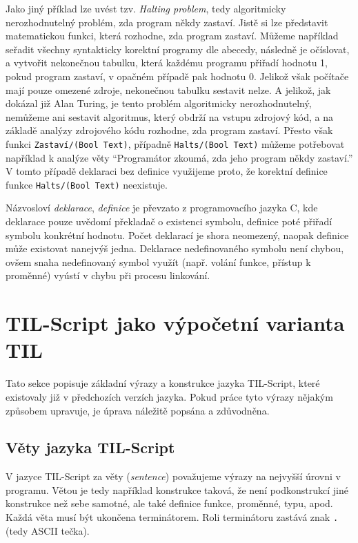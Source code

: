 Jako jiný příklad lze uvést tzv. \textit{Halting problem}, tedy algoritmicky nerozhodnutelný
problém, zda program někdy zastaví. Jistě si lze představit matematickou funkci, která rozhodne,
zda program zastaví. Můžeme například seřadit všechny syntakticky korektní programy dle abecedy,
následně je očíslovat, a vytvořit nekonečnou tabulku, která každému programu přiřadí hodnotu 1,
pokud program zastaví, v opačném případě pak hodnotu 0. Jelikož však počítače mají pouze omezené
zdroje, nekonečnou tabulku sestavit nelze. A jelikož, jak dokázal již Alan Turing, je tento problém
algoritmicky nerozhodnutelný, nemůžeme ani sestavit algoritmus, který obdrží na vstupu zdrojový kód,
a na základě analýzy zdrojového kódu rozhodne, zda program zastaví\cite{halting-problem-src}. Přesto
však funkci \lstinline{Zastaví/(Bool Text)}, případně \lstinline{Halts/(Bool Text)} můžeme
potřebovat například k analýze věty ``Programátor zkoumá, zda jeho program někdy zastaví.'' V tomto
případě deklaraci bez definice využijeme proto, že korektní definice funkce
\lstinline{Halts/(Bool Text)} neexistuje.

Názvosloví \textit{deklarace}, \textit{definice} je převzato z programovacího jazyka C, kde
deklarace pouze uvědomí překladač o existenci symbolu, definice poté přiřadí symbolu konkrétní
hodnotu. Počet deklarací je shora neomezený, naopak definice může existovat nanejvýš jedna.
Deklarace nedefinovaného symbolu není chybou, ovšem snaha nedefinovaný symbol využít (např. volání
funkce, přístup k proměnné) vyústí v chybu při procesu linkování.

\section{TIL-Script jako výpočetní varianta TIL}

Tato sekce popisuje základní výrazy a konstrukce jazyka TIL-Script, které existovaly již
v předchozích verzích jazyka. Pokud práce tyto výrazy nějakým způsobem upravuje, je úprava náležitě
popsána a zdůvodněna.\cite{til-script}\cite{vyletelek}

\subsection{Věty jazyka TIL-Script}

V jazyce TIL-Script za věty (\textit{sentence}) považujeme výrazy na nejvyšší úrovni v programu.
Větou je tedy například konstrukce taková, že není podkonstrukcí jiné konstrukce než sebe samotné,
ale také definice funkce, proměnné, typu, apod. Každá věta musí být ukončena terminátorem. Roli
terminátoru zastává znak \lstinline{.} (tedy ASCII tečka).

